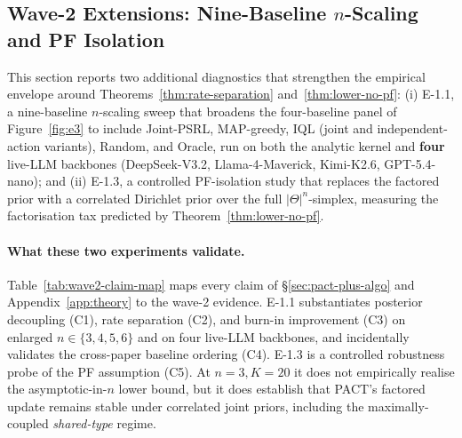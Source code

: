 \subsection{Wave-2 Extensions: Nine-Baseline $n$-Scaling and PF Isolation}
\label{app:wave2}

This section reports two additional diagnostics that strengthen the empirical envelope around Theorems~\ref{thm:rate-separation} and~\ref{thm:lower-no-pf}: (i) E-1.1, a nine-baseline $n$-scaling sweep that broadens the four-baseline panel of Figure~\ref{fig:e3} to include Joint-PSRL, MAP-greedy, IQL (joint and independent-action variants), Random, and Oracle, run on both the analytic kernel and \textbf{four} live-LLM backbones (DeepSeek-V3.2, Llama-4-Maverick, Kimi-K2.6, GPT-5.4-nano); and (ii) E-1.3, a controlled PF-isolation study that replaces the factored prior with a correlated Dirichlet prior over the full $|\Theta|^n$-simplex, measuring the factorisation tax predicted by Theorem~\ref{thm:lower-no-pf}.

\paragraph{What these two experiments validate.} Table~\ref{tab:wave2-claim-map} maps every claim of \S\ref{sec:pact-plus-algo} and Appendix~\ref{app:theory} to the wave-2 evidence. E-1.1 substantiates posterior decoupling (C1), rate separation (C2), and burn-in improvement (C3) on enlarged $n\!\in\!\{3,4,5,6\}$ and on four live-LLM backbones, and incidentally validates the cross-paper baseline ordering (C4). E-1.3 is a controlled robustness probe of the PF assumption (C5). At $n{=}3, K{=}20$ it does not empirically realise the asymptotic-in-$n$ lower bound, but it does establish that PACT's factored update remains stable under correlated joint priors, including the maximally-coupled \emph{shared-type} regime.

